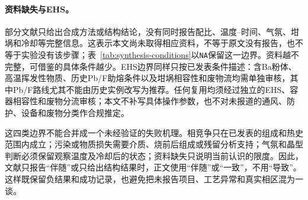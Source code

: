 \paragraph{资料缺失与EHS。}
部分文献只给出合成方法或结构结论，没有同时报告配比、温度--时间、气氛、坩埚和冷却等完整信息\cite{ababaikeri2024ba5y12zn,ababaikeri2024ba3zn4si4o15,kaiser2002crystal,cai2024optimized,zhao2026crystal}。这表示本文尚未取得相应资料，不等于原文没有报告，也不等于实验没有该步骤；表~\ref{tab:synthesis-conditions}以\texttt{NA}保留这一边界。资料越不完整，可借鉴的具体条件越少。EHS边界同样只按已发表条件描述：含Ba粉体、高温挥发性物质、历史Pb/F助熔条件以及坩埚相容性和废物流均需单独审核，其中Pb/F路线尤其不能由历史实例改写为推荐\cite{giess1982zn2sio4}。任何复用均须经过独立的EHS、容器相容性和废物分流审核；本文不补写具体操作参数，也不对未报道的通风、防护、设备和废物分类作合规推定。

这四类边界不能合并成一个未经验证的失败机理。相竞争只在已发表的组成和热史范围内成立；污染或物质损失需要介质、烧前后组成或残留分析支持；气氛和晶型判断必须保留观察温度及冷却后的状态；资料缺失只说明当前认识的限度。因此，文献只报告“伴随”或只给出结构结果时，正文使用“伴随”或“一致”，不用“导致”。这样既保留负结果和成功记录，也避免把未报告项目、工艺异常和真实相区混为一谈。
